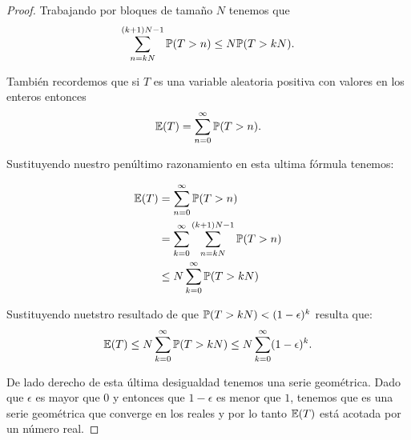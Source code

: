 \begin{proof}
	Trabajando por bloques de tamaño $N$ tenemos que 
	\begin{align}
		\sum_{n = kN}^{(k+1)N -1} \mathbb{P}(T > n) \leq N \mathbb{P}(T > kN).
	\end{align}		
	
	También recordemos que si $T$ es una variable aleatoria positiva con valores en los enteros entonces 
	\begin{align}
		\mathbb{E}(T) = \sum_{n=0}^{\infty} \mathbb{P}(T > n).
	\end{align}
	
	Sustituyendo nuestro penúltimo razonamiento en esta ultima fórmula tenemos:
	
	\begin{align}
		\mathbb{E}(T) 	&= 		\sum_{n=0}^{\infty} \mathbb{P}(T > n) \\
				&= 		\sum_{k=0}^{\infty} \sum_{n = kN}^{(k+1)N -1} \mathbb{P}(T > n) \\
				&\leq 	N \sum_{k=0}^{\infty} \mathbb{P}(T > kN)
	\end{align}
		
	Sustituyendo nuetstro resultado de que $\mathbb{P}(T>kN)<(1-\epsilon)^{k}$ resulta que:
	\begin{align}
		\mathbb{E}(T)\leq N \sum_{k=0}^{\infty} \mathbb{P}(T > kN) \leq N \sum_{k=0}^{\infty} (1-\epsilon)^k.
	\end{align}
	
	De lado derecho de esta última desigualdad tenemos una serie geométrica. Dado que $\epsilon$ es mayor 
	que $0$ y entonces que $1-\epsilon$ es menor que $1$, tenemos que es una serie geométrica que converge 
	en los reales y por lo tanto $\mathbb{E}(T)$ está acotada por un número real.
	
\end{proof}	